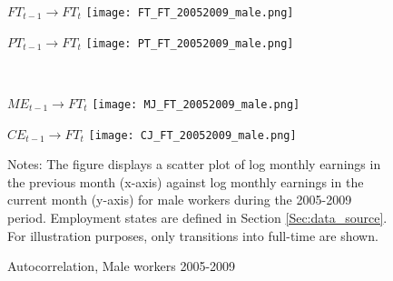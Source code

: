 \documentclass[12pt, a4paper]{article}
\begin{document}
\begin{figure}[!t]
	\centering
	\begin{minipage}[b]{0.48\textwidth}{$FT_{t-1}$$\rightarrow$$FT_{t}$}
		\centering
		\texttt{[image: FT\_FT\_20052009\_male.png]}
	\end{minipage}
	\begin{minipage}[b]{0.48\textwidth}{$PT_{t-1}$$\rightarrow$$FT_{t}$}
		\centering
		\texttt{[image: PT\_FT\_20052009\_male.png]}
	\end{minipage}\\
	\vspace{5mm}
	\centering
	\begin{minipage}[b]{0.48\textwidth}{$ME_{t-1}$$\rightarrow$$FT_{t}$}
		\centering
		\texttt{[image: MJ\_FT\_20052009\_male.png]}
	\end{minipage}
	\begin{minipage}[b]{0.48\textwidth}{$CE_{t-1}$$\rightarrow$$FT_{t}$}
		\centering
		\texttt{[image: CJ\_FT\_20052009\_male.png]}
	\end{minipage}
	\footnotesize{
		\justifying Notes: The figure displays a scatter plot of log monthly earnings in the previous month (x-axis) against log monthly earnings in the current month (y-axis) for male workers during the 2005-2009 period. Employment states are defined in Section \ref{Sec:data_source}. For illustration purposes, only transitions into full-time are shown.\par}
	\captionsetup{font=small,justification=raggedright}
	\caption{Autocorrelation, Male workers 2005-2009}\label{fig:autocorrelation_male_20052009}
\end{figure}
\end{document}
